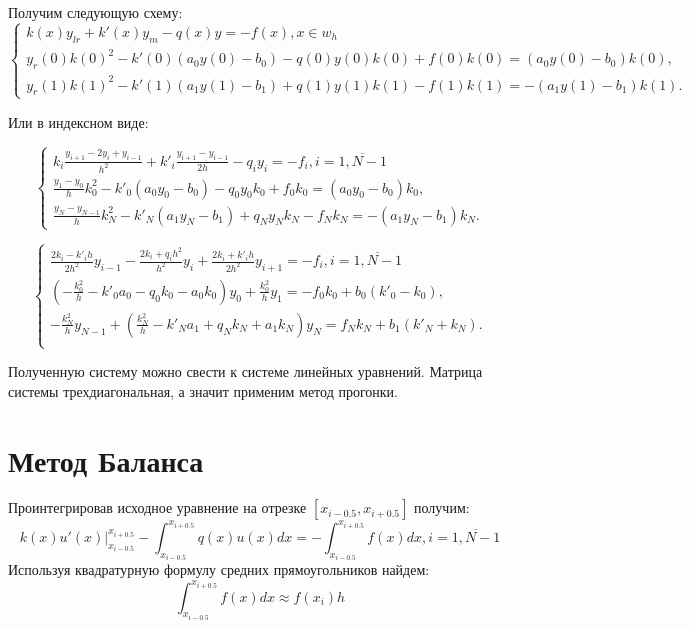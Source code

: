 \documentclass[a4paper]{article}
\begin{document}
	Получим следующую схему:
	$$ 
	\begin{cases}
	k(x) y_{lr} + k'(x) y_m - q(x) y = -f(x), x \in w_h \\
	y_r(0) k(0)^2 - k'(0) (a_0 y(0) - b_0) - q(0) y(0) k(0) + f(0) k(0) = (a_0 y(0) - b_0 ) k(0), \\
	y_r(1) k(1)^2 - k'(1) (a_1 y(1) - b_1) + q(1) y(1) k(1) - f(1) k(1) = -(a_1 y(1) - b_1 ) k(1).
	\end{cases}
	$$
	
	Или в индексном виде:
	\begin{large}
	$$ 
	\begin{cases}
	k_i \frac{y_{i+1} -2y_i +  y_{i-1}}{h^2} + k'_i  \frac{y_{i + 1} - y_{i - 1}}{2h} - q_i y_i = -f_i, i = \overline{1, N-1} \\
	\frac{y_1 - y_0}{h} k_0^2 - k'_0 (a_0 y_0 - b_0) - q_0 y_0 k_0 + f_0 k_0 = (a_0 y_0 - b_0 ) k_0, \\
	\frac{y_N - y_{N-1}}{h} k_N^2 - k'_N (a_1 y_N - b_1) + q_N y_N k_N - f_N k_N = -(a_1 y_N - b_1) k_N.
	\end{cases}
	$$
		
	$$ 
	\begin{cases}
	\frac{2k_i - k'_i h}{2h^2} y_{i-1} -
	\frac{2k_i + q_i h^2}{h^2} y_i +
	\frac{2k_i + k'_i h}{2h^2} y_{i+1}  = -f_i, i = \overline{1, N-1} \\
	(-\frac{k_0^2}{h} - k'_0 a_0 - q_0 k_0 - a_0 k_0) y_0 +
	\frac{k_0^2}{h} y_1 = 
	-f_0 k_0 + b_0 (k'_0 - k_0),\\
	-\frac{k_N^2}{h} y_{N - 1} + 
	(\frac{k_N^2}{h} - k'_N a_1 + q_N k_N + a_1 k_N) y_N = 
	f_N k_N + b_1 (k'_N + k_N).\\
	\end{cases}
	$$
	\end{large}	
	
	Полученную систему можно свести к системе линейных уравнений. Матрица системы трехдиагональная, а значит применим метод прогонки.
	
	\newpage
	
	\section{Метод Баланса}	
	Проинтегрировав исходное уравнение на отрезке $[x_{i-0.5}, x_{i+0.5}] $ получим:
	$$ 
	k(x) u'(x)\Big|_{x_{i-0.5}}^{x_{i+0.5}} - \int_{x_{i-0.5}}^{x_{i+0.5}} q(x) u(x) dx = -\int_{x_{i-0.5}}^{x_{i+0.5}} f(x) dx, 
	i = \overline{1, N-1}
	$$
	Используя квадратурную формулу средних прямоугольников найдем:
	$$ 
	\int_{x_{i-0.5}}^{x_{i+0.5}} f(x) dx \approx 
	f(x_i) h
	$$
	
\end{document}
